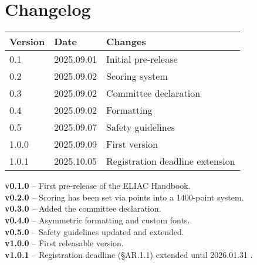 
\section*{Changelog}

\begin{tabular}{lll}
\toprule
Version & Date & Changes \\ \midrule
0.1 & 2025.09.01 & Initial pre-release \\ \midrule
0.2 & 2025.09.02 & Scoring system\\ \midrule
0.3 & 2025.09.02 & Committee declaration\\ \midrule
0.4 & 2025.09.02 & Formatting\\ \midrule
0.5 & 2025.09.07 & Safety guidelines\\ \midrule
1.0.0 & 2025.09.09 & First version\\ \midrule
1.0.1 & 2025.10.05 & Registration deadline extension\\ \bottomrule
\end{tabular}

\vspace{1cm}

\noindent\textbf{v0.1.0} – First pre-release of the ELIAC Handbook.\\
\noindent\textbf{v0.2.0} – Scoring has been set via points into a 1400-point system.\\
\noindent\textbf{v0.3.0} – Added the committee declaration.\\
\noindent\textbf{v0.4.0} – Asymmetric formatting and custom fonts.\\
\noindent\textbf{v0.5.0} – Safety guidelines updated and extended.\\
\noindent\textbf{v1.0.0} – First releasable version.\\
\noindent\textbf{v1.0.1} – Registration deadline (§AR.1.1) extended until 2026.01.31 .